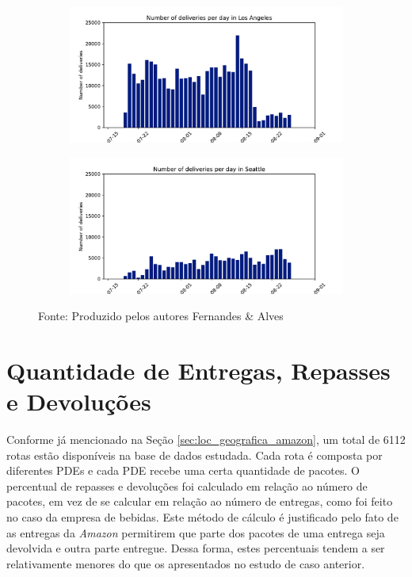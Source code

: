 \begin{figure}[H]
\begin{subfigure}{.45\textwidth}
    \end{subfigure}
    \begin{subfigure}{.45\textwidth}
        \includegraphics[width=\textwidth]{images/6_amazon/times/la_deliveries_times.pdf}
    \end{subfigure}
    \begin{subfigure}{.45\textwidth}
        \includegraphics[width=\textwidth]{images/6_amazon/times/seattle_deliveries_times.pdf}
    \end{subfigure}
    \caption*{Fonte: Produzido pelos autores Fernandes \& Alves}
\end{figure}


\section{Quantidade de Entregas, Repasses e Devoluções}

Conforme já mencionado na Seção \ref{sec:loc_geografica_amazon}, um total de 6112 rotas estão disponíveis na base de dados estudada.
Cada rota é composta por diferentes PDEs e cada PDE recebe uma certa quantidade de pacotes.
O percentual de repasses e devoluções foi calculado em relação ao número de pacotes, em vez de se calcular em relação ao número de entregas, como foi feito no caso da empresa de bebidas. 
Este método de cálculo é justificado pelo fato de as entregas da \textit{Amazon} permitirem que parte dos pacotes de uma entrega seja devolvida e outra parte entregue.
Dessa forma, estes percentuais tendem a ser relativamente menores do que os apresentados no estudo de caso anterior. 


